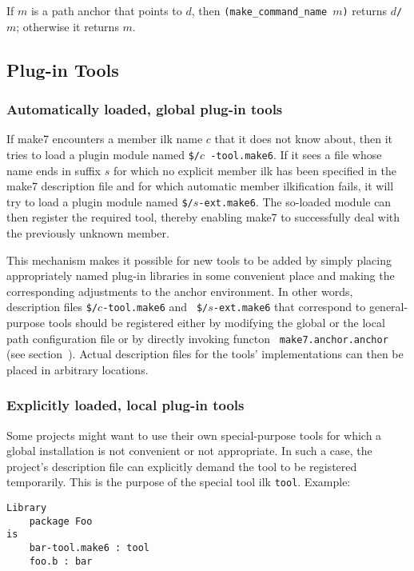 If $m$ is a path anchor that points to $d$, then {\tt (make_command_name $m$)}
returns $d${\tt /}$m$; otherwise it returns $m$.

\subsection{Plug-in Tools}
\label{sec:plugintools}

\subsubsection{Automatically loaded, global plug-in tools}

If make7 encounters a member ilk name $c$ that it does not know about,
then it tries to load a plugin module named {\tt \$/}$c${\tt
-tool.make6}.  If it sees a file whose name ends in suffix $s$ for which
no explicit member ilk has been specified in the make7 description file
and for which automatic member ilkification fails, it will try to
load a plugin module named {\tt \$/}$s${\tt -ext.make6}.  The so-loaded
module can then register the required tool, thereby enabling make7 to
successfully deal with the previously unknown member.

This mechanism makes it possible for new tools to be added by simply
placing appropriately named plug-in libraries in some convenient place
and making the corresponding adjustments to the anchor environment.
In other words, description files {\tt \$/}$c${\tt -tool.make6} and {\tt
\$/}$s${\tt -ext.make6} that correspond to general-purpose tools should
be registered either by modifying the global or the local path
configuration file or by directly invoking functon {\tt
make7.anchor.anchor} (see section~).  Actual
description files for the tools' implementations can then be placed in
arbitrary locations.

\subsubsection{Explicitly loaded, local plug-in tools}
\label{sec:localtools}

Some projects might want to use their own special-purpose tools for
which a global installation is not convenient or not appropriate.  In
such a case, the project's description file can explicitly demand the
tool to be registered temporarily.  This is the purpose of the special
tool ilk {\tt tool}.  Example:

\begin{verbatim}
Library
    package Foo
is
    bar-tool.make6 : tool
    foo.b : bar
\end{verbatim}

